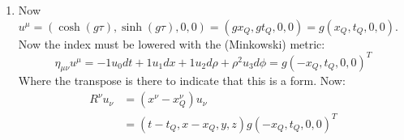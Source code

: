 \documentclass[12pt,a4]{article}
\begin{document}
\begin{enumerate}
\begin{enumerate}
\begin{align*}
          A^\mu &=\frac{1}{4 \pi}\int J^\mu (\mathbf{r}', t_r') \frac{\delta((t - t') - |\mathbf{r} - \mathbf{r}'|)}{|\mathbf{r} - \mathbf{r}'|}dt' d^3 r'\\
                &=\frac{1}{2 \pi}\int J^\mu (\mathbf{r}', t_r') \delta((t - t')^2 - |\mathbf{r} - \mathbf{r}'|^2)dt' d^3 r'\\
                &=\frac{1}{2 \pi}\int J^\mu (\mathbf{r}', t_r') \delta((x^\nu - x'^\nu)(x_\nu - x'_\nu))d^4x'\\
                &=\frac{1}{2 \pi}\int Q u^\mu \delta^4(x'^\nu - x_Q'^\nu)|_{t'_r} \delta((x^\nu - x'^\nu)(x_\nu - x'_\nu))d \tau' d^4x' \\
                &=\frac{1}{2 \pi}Q \left.\int  u^\mu \delta((x_Q'^\nu - x'^\nu)(x'\tensor{}{_Q_\nu} - x'_\nu)) d \tau' \right|_{t'_r}
        \end{align*}
        Now $(x_Q'^\mu - x'^\mu)(x'\tensor{}{_Q_\mu} - x'_\mu)$ is implicitly a function of $\tau$, therefore using Equation~\ref{eq:diracdeltafunction}:
        \begin{align*}
          \delta((x_Q'^\mu - x'^\mu)(x'\tensor{}{_Q_\mu} - x'_\mu)) = \frac{\delta(\tau - \tau')}{|(x_Q'^\mu - x'^\mu)\partial_\tau x'\tensor{}{_Q_\mu} + (x_Q'^\mu - x'_\mu)\partial_\tau x_Q'^\mu|} = \frac{\delta(\tau - \tau')}{2|(x'^\mu - x_Q'^\mu)u_\mu|}
        \end{align*}
        And using this in the expression for $A^\mu$ and carrying out the $\tau '$ integral over the delta function:
        \begin{align*}
          A^\mu &=\frac{1}{4 \pi}Q \frac{u^\mu}{|(x'^\nu - x_Q'^\nu)u_\nu|}
        \end{align*}
        Choosing units that set $4 \pi = 1$ gives the desired relation.
      \item
        Now $u^\mu = (\cosh(g \tau), \sinh(g \tau), 0, 0) = (g x_Q, g t_Q, 0, 0) = g(x_Q,t_Q, 0, 0)$. 
        Now the index must be lowered with the (Minkowski) metric:
        \begin{equation*}
          \eta_{\mu\nu} u^\mu = -1 u_0 dt + 1 u_1 dx + 1 u_2 d\rho + \rho^2 u_3 d\phi = g(-x_Q,t_Q, 0, 0)^{T}
        \end{equation*}
        Where the transpose is there to indicate that this is a form.
        Now:
        \begin{align*}
          R^\nu u_\nu &= (x^\nu - x_Q^\nu)u_\nu\\
                      &= (t - t_Q, x - x_Q, y, z) g (-x_Q, t_Q, 0, 0)^T\\

\end{align*}
\end{enumerate}
\end{enumerate}
\end{document}
